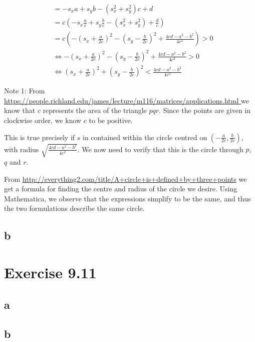\documentclass[11pt,a4paper]{article}
\begin{document}
\begin{align}
    &= - s_x a + s_y b - (s_x^2+s_y^2) c + d \\
    &= c (- s_x \frac{a}{c} + s_y \frac{b}{c} - (s_x^2+s_y^2) + \frac{d}{c})\\
    &= c (- (s_x + \frac{a}{2c})^2 - (s_y - \frac{b}{2c})^2 + \frac{4cd-a^2-b^2}{4c^2}) > 0 \\
    &\Leftrightarrow - (s_x + \frac{a}{2c})^2 - (s_y - \frac{b}{2c})^2 + \frac{4cd-a^2-b^2}{4c^2} > 0 \tag{Since c > 0, see note 1.} \\ 
    &\Leftrightarrow (s_x + \frac{a}{2c})^2 + (s_y - \frac{b}{2c})^2 < \frac{4cd-a^2-b^2}{4c^2}
\end{align}

Note 1: From
\url{https://people.richland.edu/james/lecture/m116/matrices/applications.html
} we know that $c$ represents the area of the triangle $pqr$. Since the points
are given in clockwise order, we know $c$ to be positive.

This is true precisely if $s$ in contained within the circle
centred on $(-\frac{a}{2c}, \frac{b}{2c})$, with radius
$\sqrt{\frac{4cd-a^2-b^2}{4c^2}}$. We now need to verify that this is the
circle through $p$, $q$ and $r$.

From \url{http://everything2.com/title/A+circle+is+defined+by+three+points} we
get a formula for finding the centre and radius of the circle we desire. Using
Mathematica, we observe that the expressions simplify to be the same, and thus
the two formulations describe the same circle.

\subsection{b}


\section{Exercise 9.11}
\subsection{a}


\subsection{b}
\end{document}
